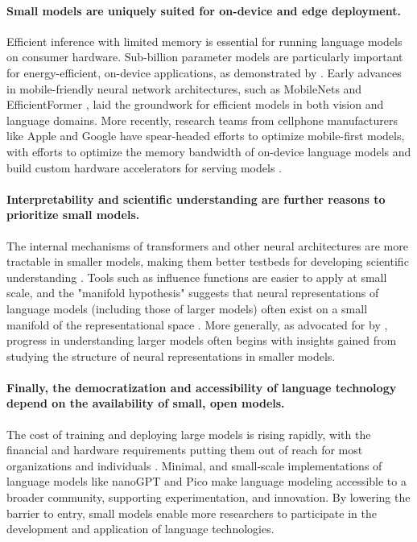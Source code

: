 \paragraph{Small models are uniquely suited for on-device and edge deployment.} Efficient inference with limited memory is essential for running language models on consumer hardware. Sub-billion parameter models are particularly important for energy-efficient, on-device applications, as demonstrated by \citet{liu2024mobilellm}. Early advances in mobile-friendly neural network architectures, such as MobileNets \citep{howard2017mobilenets} and EfficientFormer \citep{li2022efficientformer}, laid the groundwork for efficient models in both vision and language domains. More recently, research teams from cellphone manufacturers like Apple and Google have spear-headed efforts to optimize mobile-first models, with efforts to optimize the memory bandwidth of on-device language models \citep{alizadeh2024llm} and build custom hardware accelerators for serving models \citep{deepmind2023gemini}. %
 

\paragraph{Interpretability and scientific understanding are further reasons to prioritize small models.} The internal mechanisms of transformers and other neural architectures are more tractable in smaller models, making them better testbeds for developing scientific understanding \citep{elhage2021mathematical, elhage2022toy, bircken2023monosemanticity, anthropic2023components}. Tools such as influence functions are easier to apply at small scale, and the "manifold hypothesis" suggests that neural representations of language models (including those of larger models) often exist on a small manifold of the representational space \citep{olah2014manifolds}. More generally, as advocated for by \citet{elhage2021mathematical}, progress in understanding larger models often begins with insights gained from studying the structure of neural representations in smaller models.

\paragraph{Finally, the democratization and accessibility of language technology depend on the availability of small, open models.} The cost of training and deploying large models is rising rapidly, with the financial and hardware requirements putting them out of reach for most organizations and individuals \citep{cottier2024rising, sharir2020cost}. Minimal, and small-scale implementations of language models like nanoGPT \citep{karpathy2023nanogpt} and Pico \citep{diehlmartinez2025pico} make language modeling accessible to a broader community, supporting experimentation, and innovation. By lowering the barrier to entry, small models enable more researchers to participate in the development and application of language technologies.

